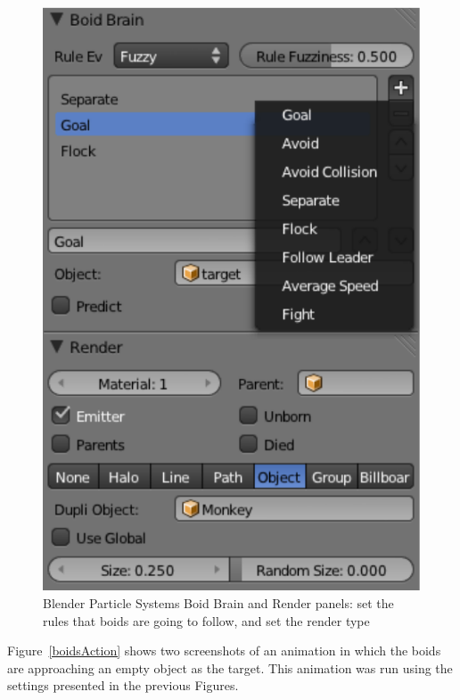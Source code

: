 \begin{figure}[htbp]
\begin{center}
\includegraphics[scale = 0.65]{figures/boidsBrain.pdf}
\caption{Blender Particle Systems Boid Brain and Render panels: set the rules that boids are going to follow, and set the render type}
\label{boidsBrain}
\end{center}
\end{figure}

Figure~\ref{boidsAction} shows two screenshots of an animation in which the boids are approaching an empty object as the target. This animation was run using the settings presented in the previous Figures.

